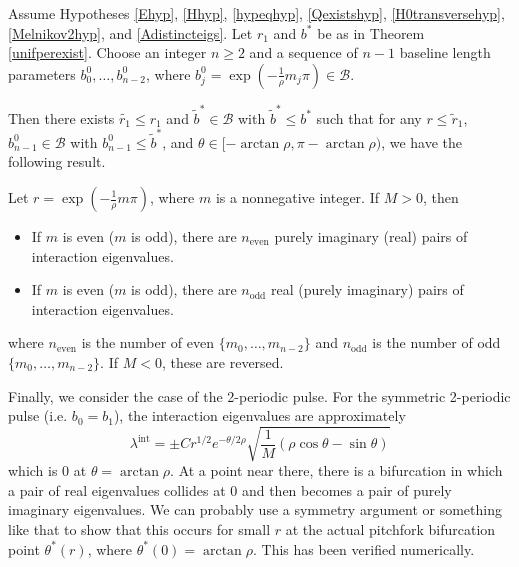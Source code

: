 \documentclass[thesis.tex]{subfiles}
\begin{document}
\begin{theorem}\label{inteigsparity}
Assume Hypotheses \ref{Ehyp}, \ref{Hhyp}, \ref{hypeqhyp}, \ref{Qexistshyp}, \ref{H0transversehyp}, \ref{Melnikov2hyp}, and \ref{Adistincteigs}. Let $r_1$ and $b^*$ be as in Theorem \ref{unifperexist}. Choose an integer $n \geq 2$ and a sequence of $n-1$ baseline length parameters $b_0^0, \dots, b_{n-2}^0$, where $b_j^0 = \exp\left(-\frac{1}{\rho}m_j \pi\right) \in \mathcal{B}$. 

Then there exists $\tilde{r_1} \leq r_1$ and $\tilde{b}^* \in \mathcal{B}$ with $\tilde{b}^* \leq b^*$ such that for any $r \leq \tilde{r}_1$, $b_{n-1}^0 \in \mathcal{B}$ with $b_{n-1}^0 \leq \tilde{b}^*$, and $\theta \in [-\arctan \rho, \pi - \arctan \rho)$, we have the following result.

Let $r = \exp\left( -\frac{1}{\rho} m \pi \right)$, where $m$ is a nonnegative integer. If $M > 0$, then 
\begin{itemize}
\item If $m$ is even ($m$ is odd), there are $n_{\text{even}}$ purely imaginary (real) pairs of interaction eigenvalues.
\item If $m$ is even ($m$ is odd), there are $n_{\text{odd}}$ real (purely imaginary) pairs of interaction eigenvalues.
\end{itemize}
where $n_{\text{even}}$ is the number of even $\{m_0, \dots, m_{n-2}\}$ and $n_{\text{odd}}$ is the number of odd $\{m_0, \dots, m_{n-2}\}$. If $M < 0$, these are reversed.
\end{theorem}

Finally, we consider the case of the 2-periodic pulse. For the symmetric 2-periodic pulse (i.e. $b_0 = b_1$), the interaction eigenvalues are approximately
\[
\lambda^{\text{int}} = \pm C r^{1/2} e^{-\theta/2\rho} \sqrt{ \frac{1}{M} \left( \rho \cos \theta - \sin \theta \right) }
\]
which is 0 at $\theta = \arctan \rho$. At a point near there, there is a bifurcation in which a pair of real eigenvalues collides at 0 and then becomes a pair of purely imaginary eigenvalues. We can probably use a symmetry argument or something like that to show that this occurs for small $r$ at the actual pitchfork bifurcation point $\theta^*(r)$, where $\theta^*(0) = \arctan \rho$. This has been verified numerically.

\iffulldocument\else
	
	
\fi
\end{document}
